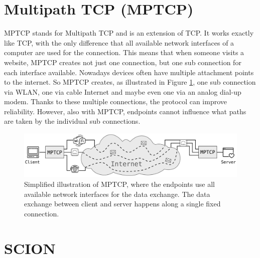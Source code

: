 \section{Multipath TCP (MPTCP)}

MPTCP stands for Multipath TCP and is an extension of TCP. It works exactly like TCP, with the only difference that all available network interfaces of a computer are used for the connection. This means that when someone visits a website, MPTCP creates not just one connection, but one sub connection for each interface available. Nowadays devices often have multiple attachment points to the internet. So MPTCP creates, as illustrated in Figure \ref{fig:IntroMPTCP}, one sub connection via WLAN, one via cable Internet and maybe even one via an analog dial-up modem. Thanks to these multiple connections, the protocol can improve reliability. However, also with MPTCP, endpoints cannot influence what paths are taken by the individual sub connections. 

\begin{figure}[H]
	\begin{center}
		\def\svgwidth{1\textwidth}
		\includegraphics[scale=0.28]{../illustrations/introduction/MPTCPConnection.pdf}    
		\caption[Caption for the list of figures.]{Simplified illustration of MPTCP, where the endpoints use all available network interfaces for the data exchange. The data exchange between client and server happens along a single fixed connection.}
		\label{fig:IntroMPTCP}
	\end{center}
\end{figure}

\section{SCION}

